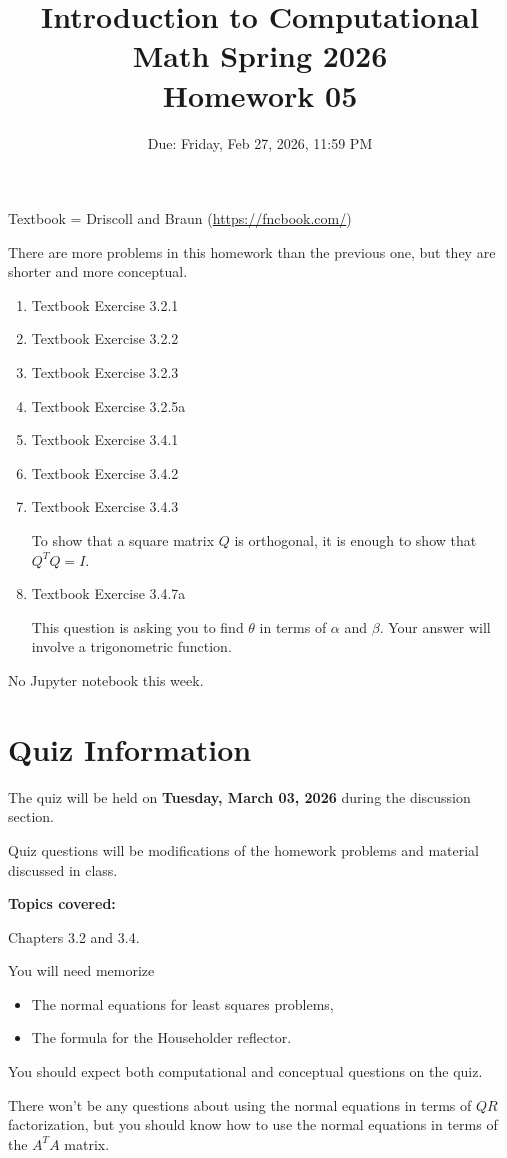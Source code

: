 \documentclass[reqno]{exam}
\title{Introduction to Computational Math Spring 2026 \\ Homework 05}
\date{Due: Friday, Feb 27, 2026, 11:59 PM}
\author{}
\begin{document}
\maketitle
\thispagestyle{empty}

Textbook = Driscoll and Braun (\url{https://fncbook.com/})

There are more problems in this homework than the previous one, but they are shorter and more conceptual.

\begin{enumerate}


\item Textbook Exercise 3.2.1

\item Textbook Exercise 3.2.2

\item Textbook Exercise 3.2.3

\item Textbook Exercise 3.2.5a

\item Textbook Exercise 3.4.1

\item Textbook Exercise 3.4.2

\item Textbook Exercise 3.4.3

To show that a square matrix $Q$ is orthogonal, it is enough to show that $Q^T Q = I$.

\item Textbook Exercise 3.4.7a

This question is asking you to find $\theta$ in terms of $\alpha$ and $\beta$. Your answer will involve a trigonometric function. 

\end{enumerate}

No Jupyter notebook this week.



\section*{Quiz Information}

The quiz will be held on {\bf Tuesday, March 03, 2026} during the discussion section.

Quiz questions will be modifications of the homework problems and material discussed in class.

\textbf{Topics covered:} 

Chapters 3.2 and 3.4. 

You will need memorize 
\begin{itemize}
    \item The normal equations for least squares problems,
    \item The formula for the Householder reflector.
\end{itemize}

You should expect both computational and conceptual questions on the quiz.

There won't be any questions about using the normal equations in terms of $QR$ factorization, but you should know how to use the normal equations in terms of the $A^T A$ matrix.
\end{document}
